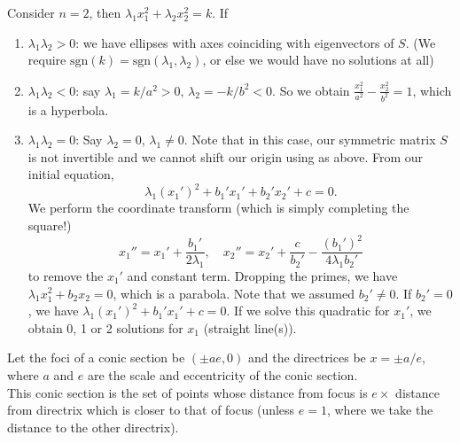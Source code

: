 \documentclass[a4paper]{article}
\begin{document}
\begin{eg}
Consider $n=2$, then $\lambda_1x_1^2+\lambda_2x_2^2=k$. If
\begin{enumerate}
  \item $\lambda_1\lambda_2 > 0$: we have ellipses with axes coinciding with eigenvectors of $S$. (We require $\mathrm{sgn}(k) = \mathrm{sgn}(\lambda_1,\lambda_2)$, or else we would have no solutions at all)
  \item $\lambda_1\lambda_2 < 0$: say $\lambda_1 = k/a^2 > 0$, $\lambda_2 = -k/b^2 < 0$. So we obtain $\frac{x_1^2}{a^2} - \frac{x_2^2}{b^2} = 1$, which is a hyperbola.
  \item $\lambda_1\lambda_2 = 0$: Say $\lambda_2 = 0$, $\lambda_1\not= 0$. Note that in this case, our symmetric matrix $S$ is not invertible and we cannot shift our origin using as above. From our initial equation, 
    \[
      \lambda_1(x_1')^2 + b_1'x_1' + b_2' x_2' + c = 0.
    \]
    We perform the coordinate transform (which is simply completing the square!)
$$x_1'' = x_1' + \frac{b_1'}{2\lambda_1},\quad x_2'' = x_2' + \frac{c}{b_2'} - \frac{(b_1')^2}{4\lambda_1b_2'}$$
    to remove the $x_1'$ and constant term. Dropping the primes, we have $\lambda_1 x_1^2 + b_2 x_2 = 0$, which is a parabola. Note that we assumed $b_2'\neq 0$. If $b_2' = 0$, we have $\lambda_1(x_1')^2 + b_1' x_1' + c = 0$. If we solve this quadratic for $x_1'$, we obtain 0, 1 or 2 solutions for $x_1$ (straight line(s)).
\end{enumerate}
\end{eg}
\begin{defi}
Let the foci of a conic section be $(\pm ae, 0)$ and the directrices be $x = \pm a/e$, where $a$ and $e$ are the scale and eccentricity of the conic section.\\[5pt]
This conic section is the set of points whose distance from focus is $e \times$ distance from directrix which is closer to that of focus (unless $e = 1$, where we take the distance to the other directrix).
\end{defi}
\end{document}
